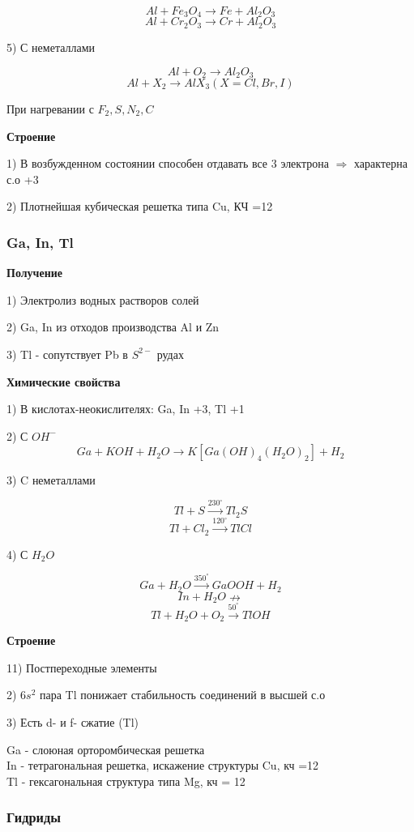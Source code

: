 \documentclass[14pt,a4paper]{scrartcl}
\begin{document}
$$Al + Fe_3O_4 \rightarrow Fe + Al_2O_3$$
$$ Al + Cr_2O_3 \rightarrow Cr + Al_2O_3$$

5) С неметаллами

$$Al + O_2 \rightarrow Al_2O_3$$
$$Al + X_2 \rightarrow AlX_3 (X=Cl,Br, I)$$

При нагревании с $F_2, S, N_2, C$

\textbf{Строение}

1) В возбужденном состоянии способен отдавать все 3 электрона $\Rightarrow$ характерна с.о +3

2) Плотнейшая кубическая решетка типа Cu, КЧ =12

\subsubsection{Ga, In, Tl}

\textbf{Получение}

1) Электролиз водных растворов солей

2) Ga, In из отходов производства Al и Zn

3) Tl - сопутствует Pb в $S^{2-}$ рудах

\textbf{Химические свойства}

1) В кислотах-неокислителях: Ga, In +3, Tl +1

2) С $OH^-$
$$ Ga + KOH + H_2O \rightarrow K[Ga(OH)_4(H_2O)_2] + H_2$$

3) C неметаллами

$$Tl + S \xrightarrow{230^{\circ}} Tl_2S$$
$$Tl + Cl_2 \xrightarrow{120^{\circ}} TlCl$$

4) С $H_2O$

$$Ga + H_2O \xrightarrow{350^{\circ}} GaOOH + H_2$$
$$In + H_2O \nrightarrow$$
$$Tl + H_2O + O_2 \xrightarrow{50^{\circ}} TlOH$$

\textbf{Строение}

11) Постпереходные элементы

2) $6s^2$ пара Tl понижает стабильность соединений в высшей с.о

3) Есть d- и f- сжатие (Tl)

Ga - слоюная орторомбическая решетка\\
In - тетрагональная решетка, искажение структуры Cu, кч =12\\
Tl - гексагональная структура типа Mg, кч = 12

\subsubsection{Гидриды}
\end{document}
